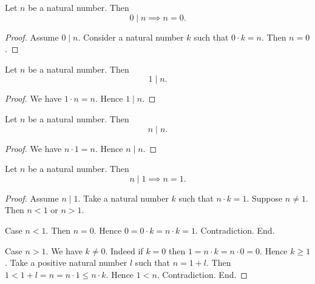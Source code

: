 \documentclass[10pt]{article}
\begin{document}
  \begin{forthel}
    \begin{proposition}
      Let $n$ be a natural number.
      Then \[ 0 \mid n \implies n = 0. \]
    \end{proposition}
    \begin{proof}
      Assume $0 \mid n$.
      Consider a natural number $k$ such that $0 \cdot k = n$.
      Then $n = 0$.
    \end{proof}
  \end{forthel}

  \begin{forthel}
    \begin{proposition}
      Let $n$ be a natural number.
      Then \[ 1 \mid n. \]
    \end{proposition}
    \begin{proof}
      We have $1 \cdot n = n$.
      Hence $1 \mid n$.
    \end{proof}
  \end{forthel}

  \begin{forthel}
    \begin{proposition}
      Let $n$ be a natural number.
      Then \[ n \mid n. \]
    \end{proposition}
    \begin{proof}
      We have $n \cdot 1 = n$.
      Hence $n \mid n$.
    \end{proof}
  \end{forthel}

  \begin{forthel}
    \begin{proposition}
      Let $n$ be a natural number.
      Then \[ n \mid 1 \implies n = 1. \]
    \end{proposition}
    \begin{proof}
      Assume $n \mid 1$.
      Take a natural number $k$ such that $n \cdot k = 1$.
      Suppose $n \neq 1$.
      Then $n < 1$ or $n > 1$.

      Case $n < 1$.
        Then $n = 0$.
        Hence $0
          = 0 \cdot k
          = n \cdot k
          = 1$.
        Contradiction.
      End.

      Case $n > 1$.
        We have $k \neq 0$.
        Indeed if $k = 0$ then
        $1
          = n \cdot k
          = n \cdot 0
          = 0$.
        Hence $k \geq 1$.
        Take a positive natural number $l$ such that $n = 1 + l$.
        Then $1
          < 1 + l
          = n
          = n \cdot 1
          \leq n \cdot k$.
        Hence $1 < n$.
        Contradiction.
      End.
    \end{proof}
  \end{forthel}
\end{document}
